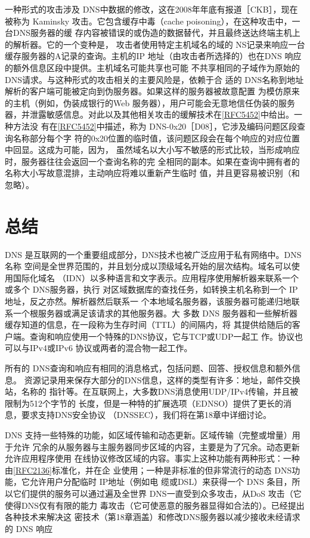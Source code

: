 一种形式的攻击涉及 DNS中数据的修改，这在2008年年底有报道［CKB］，现在被称为
Kaminsky 攻击。它包含缓存中毒（cache poisoning），在这种攻击中，一台DNS服务器的缓
存内容被错误的或伪造的数据替代，并且最终送达终端主机上的解析器。它的一个变种是，
攻击者使用特定主机域名的域的 NS记录来响应一台缓存服务器的A记录的查询。主机的IP
地址（由攻击者所选择的）也在DNS 响应的额外信息区段中提供。主机域名可能共享也可能
不共享相同的子域作为原始的 DNS请求。与这种形式的攻击相关的主要风险是，依赖于合
适的 DNS名称到地址解析的客户端可能被定向到伪服务器。如果这样的服务器被故意配置
为模仿原来的主机（例如，伪装成银行的Web 服务器），用户可能会无意地信任伪装的服务
器，并泄露敏感信息。对此以及其他相关攻击的缓解技术在\href{https://www.rfc-editor.org/rfc/rfc5452}{[RFC5452]}中给出。一种方法没
有在\href{https://www.rfc-editor.org/rfc/rfc5452}{[RFC5452]}中描述，称为 DNS-0x20［D08］，它涉及编码问题区段查询名称部分每个字
符的0x20位置的临时值，该问题区段会在每个响应的对应位置中回显。这成为可能，因为，
虽然域名以大小写不敏感的形式比较，当形成响应时，服务器往往会返回一个查询名称的完
全相同的副本。如果在查询中拥有者的名称大小写故意混排，主动响应将难以重新产生临时
值，并且更容易被识别（和忽略）。

\section{总结}

DNS 是互联网的一个重要组成部分，DNS技术也被广泛应用于私有网络中。DNS名称
空间是全世界范围的，并且划分成以顶级域名开始的层次结构。域名可以使用国际化域名
（IDN）以多种语言和文字表示。应用程序使用解析器来联系一个或多个 DNS服务器，执行
对区域数据库的查找任务，如转换主机名称到一个 IP 地址，反之亦然。解析器然后联系一
个本地域名服务器，该服务器可能递归地联系一个根服务器或满足该请求的其他服务器。大
多数 DNS 服务器和一些解析器缓存知道的信息，在一段称为生存时间（TTL）的间隔内，将
其提供给随后的客户端。查询和响应使用一个特殊的DNS协议，它与TCP或UDP一起工
作。协议也可以与IPv4或IPv6 协议或两者的混合物一起工作。

所有的 DNS查询和响应有相同的消息格式，包括问题、回答、授权信息和额外信息。
资源记录用来保存大部分的DNS信息，这样的类型有许多：地址，邮件交换站，名称的
指针等。在互联网上，大多数DNS消息使用UDP/IPv4传输，并且被限制为512个字节的
长度，但是一种特的扩展选项（EDNSO）提供了更长的消息，要求支持DNS安全协议
（DNSSEC），我们将在第18章中详细讨论。

DNS 支持一些特殊的功能，如区域传输和动态更新。区域传输（完整或增量）用于允许
冗余的从服务器与主服务器同步区域的内容，主要是为了冗余。动态更新允许应用程序使用
在线协议修改区域的内容。事实上这种功能有两种形式：一种由\href{https://www.rfc-editor.org/rfc/rfc2136}{[RFC2136]}标准化，并在企
业使用；一种是非标准的但非常流行的动态 DNS功能，它允许用户分配临时 IP地址（例如电
缆或DSL）来获得一个 DNS 条目，所以它们提供的服务可以通过遍及全世界
DNS一直受到众多攻击，从DoS 攻击（它使得DNS仅有有限的能力
毒攻击（它可使恶意的服务器显得如合法的）。已经提出各种技术来解决这
密技术（第18章涵盖）和修改DNS服务器以减少接收未经请求的 DNS 响应

